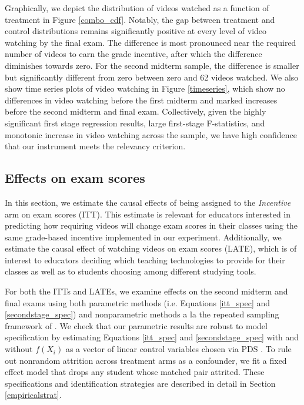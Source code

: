 \documentclass[12pt]{article}
\begin{document}
Graphically, we depict the distribution of videos watched as a function of treatment in Figure \ref{combo_cdf}. Notably, the gap between treatment and control distributions remains significantly positive at every level of video watching by the final exam. The difference is most pronounced near the required number of videos to earn the grade incentive, after which the difference diminishes towards zero. For the second midterm sample, the difference is smaller but significantly different from zero between zero and 62 videos watched. We also show time series plots of video watching in Figure \ref{timeseries}, which show no differences in video watching before the first midterm and marked increases before the second midterm and final exam. Collectively, given the highly significant first stage regression results, large first-stage F-statistics, and monotonic increase in video watching across the sample, we have high confidence that our instrument meets the relevancy criterion.

\subsection{Effects on exam scores}

In this section, we estimate the causal effects of being assigned to the \textit{Incentive} arm on exam scores (ITT). This estimate is relevant for educators interested in predicting how requiring videos will change exam scores in their classes using the same grade-based incentive implemented in our experiment. Additionally, we estimate the causal effect of watching videos on exam scores (LATE), which is of interest to educators deciding which teaching technologies to provide for their classes as well as to students choosing among different studying tools.

For both the ITTs and LATEs, we examine effects on the second midterm and final exams using both parametric methods (i.e. Equations \ref{itt_spec} and \ref{secondstage_spec}) and nonparametric methods a la the repeated sampling framework of \textcite{neyman1923}%
. We check that our parametric results are robust to model specification by estimating Equations \ref{itt_spec} and \ref{secondstage_spec} with and without $f(X_i)$ as a vector of linear control variables chosen via PDS \parencite{bch2014a}. To rule out nonrandom attrition across treatment arms as a confounder, we fit a fixed effect model that drops any student whose matched pair attrited. These specifications and identification strategies are described in detail in Section \ref{empiricalstrat}.
\end{document}
